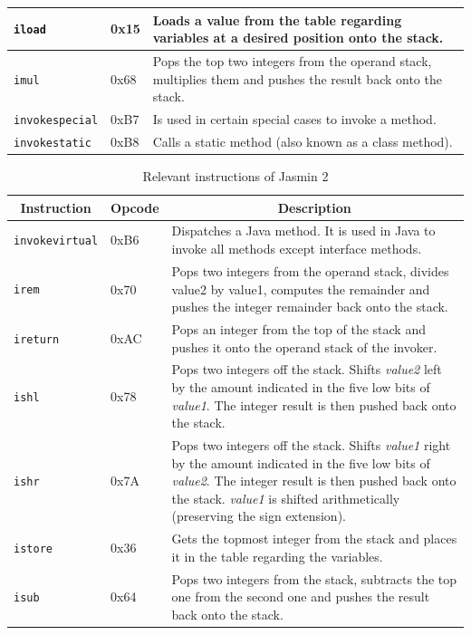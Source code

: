 \begin{table}[bth]
\begin{tabular}{|l|l|p{10cm}|}
		\texttt{iload} & 0x15 & Loads a value from the table regarding variables at a desired position onto the stack. \\\hline
		\texttt{imul} & 0x68 & Pops the top two integers from the operand stack, multiplies them and pushes the result back onto the stack. \\\hline
		\texttt{invokespecial} & 0xB7 & Is used in certain special cases to invoke a method. \\\hline
		\texttt{invokestatic} & 0xB8 & Calls a static method (also known as a class method). \\\hline	
	\end{tabular}
\end{table}

\newpage

\begin{table}[bth]
	\centering
	\caption{Relevant instructions of Jasmin 2}
	\label{tab:jasmin_instructions2}
	\begin{tabular}{|l|l|p{10cm}|}
		\hline
		\multicolumn{1}{|c|}{\textbf{Instruction}} & \multicolumn{1}{|c|}{\textbf{Opcode}} & \multicolumn{1}{|c|}{\textbf{Description}} \\\hline
		\texttt{invokevirtual} & 0xB6 & Dispatches a Java method. It is used in Java to invoke all methods except interface methods. \\\hline
		\texttt{irem} & 0x70 & Pops two integers from the operand stack, divides value2 by value1, computes the remainder and pushes the integer remainder back onto the stack. \\\hline
		\texttt{ireturn} & 0xAC & Pops an integer from the top of the stack and pushes it onto the operand stack of the invoker. \\\hline
		\texttt{ishl} & 0x78 & Pops two integers off the stack. Shifts \emph{value2} left by the amount indicated in the five low bits of \emph{value1}. The integer result is then pushed back onto the stack. \\\hline
		\texttt{ishr} & 0x7A & Pops two integers off the stack. Shifts \emph{value1} right by the amount indicated in the five low bits of \emph{value2}. The integer result is then pushed back onto the stack. \emph{value1} is shifted arithmetically (preserving the sign extension). \\\hline	
		\texttt{istore} & 0x36 & Gets the topmost integer from the stack and places it in the table regarding the variables. \\\hline
		\texttt{isub} & 0x64 & Pops two integers from the stack, subtracts the top one from the second one and pushes the result back onto the stack. \\\hline

\end{tabular}
\end{table}
